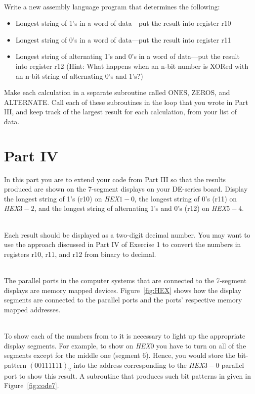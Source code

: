 \documentclass[epsfig,10pt,fullpage]{article}
\begin{document}
~\\
 Write a new assembly language program that determines the following:
\begin{itemize}
\item Longest string of 1's in a word of data---put the result into register r10
\item Longest string of 0's in a word of data---put the result into register r11
\item Longest string of alternating 1's and 0's in a word of data---put the result into 
register r12
(Hint: What happens when an n-bit number is XORed with an n-bit string of alternating 0's and 1's?)
\end{itemize}
Make each calculation in a separate subroutine called ONES, ZEROS, and ALTERNATE. Call
each of these subroutines in the loop that you wrote in Part III, and keep track of the
largest result for each calculation, from your list of data.

\section*{Part IV}
In this part you are to extend your code from Part III so that the results produced are
shown on the 7-segment displays on your DE-series board. Display the longest string of 1's
(r10) on {\it HEX}$1-0$, the longest string of 0's (r11) on {\it HEX}$3-2$, and 
the longest string of alternating 1's and 0's (r12) on {\it HEX}$5-4$.  

~\\
Each result should be displayed as a two-digit decimal number. You may want to use the approach
discussed in Part IV of Exercise 1 to convert the numbers in registers r10, r11, and r12 from
binary to decimal.  

~\\
The parallel ports in the computer systems that are connected to the 7-segment displays 
are memory mapped devices.
Figure~\ref{fig:HEX} shows how the display segments are connected to the parallel ports 
and the ports' respective memory mapped addresses.

~\\
To show each of the numbers from  to  it is necessary
to light up the appropriate display segments.
For example, to show  on {\it HEX}0 you have to turn on all 
of the segments except for the middle one (segment 6). Hence, you would store the
bit-pattern $(00111111)_2$ into the address corresponding to the {\it HEX}$3-0$ parallel port to show this result.
A subroutine that produces such bit patterns in given in Figure~\ref{fig:code7}.
\end{document}

